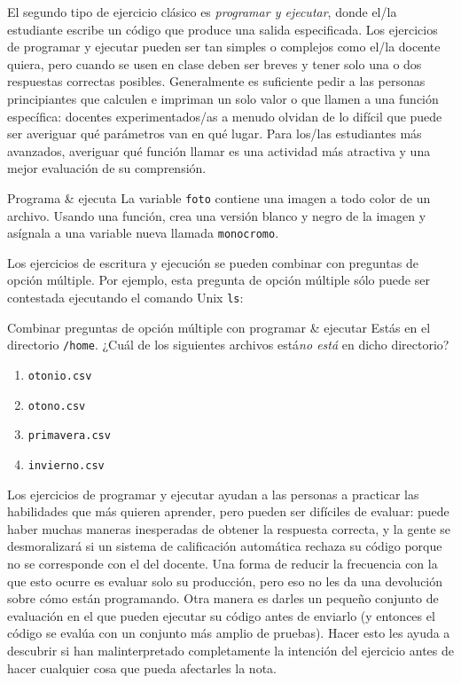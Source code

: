 El segundo tipo de ejercicio clásico es \emph{programar y ejecutar},
donde el/la estudiante escribe un código que produce una salida especificada. 
Los ejercicios de programar y ejecutar pueden ser tan simples o complejos como el/la docente quiera, pero cuando se usen en clase deben ser breves y tener solo una o dos respuestas correctas posibles.
Generalmente es suficiente pedir a las personas principiantes que calculen e impriman un solo valor o que llamen a una función específica:
docentes experimentados/as a menudo olvidan de lo difícil que puede ser averiguar qué parámetros van en qué lugar.
Para los/las estudiantes  más avanzados, averiguar qué función llamar es una actividad más atractiva y una mejor evaluación de su comprensión.

\begin{aside}{Programa \& ejecuta}
La variable \texttt{foto} contiene una imagen a todo color de un archivo.
Usando una función,
crea una versión blanco y negro de la imagen
y asígnala a una variable nueva llamada \texttt{monocromo}.
\end{aside}

Los ejercicios de escritura y ejecución se pueden combinar con preguntas de opción múltiple.
Por ejemplo,
esta pregunta de opción múltiple sólo puede ser contestada ejecutando el comando Unix \texttt{ls}:

\begin{aside}{Combinar preguntas de opción múltiple con programar \& ejecutar}
  Estás en el directorio  \texttt{/home}.
  ¿Cuál de los siguientes archivos está\emph{no está} en dicho directorio?
  \begin{enumerate}
  \item
    \texttt{otonio.csv}
  \item
    \texttt{otono.csv}
  \item
    \texttt{primavera.csv}
  \item
    \texttt{invierno.csv}
  \end{enumerate}
\end{aside}

Los ejercicios de programar y ejecutar ayudan a las personas a practicar las habilidades que más quieren aprender,
pero pueden ser  difíciles de evaluar:
puede haber muchas maneras inesperadas de obtener la respuesta correcta,
y la gente se desmoralizará si un sistema de calificación automática rechaza su código porque no se corresponde con el del docente.
Una forma de reducir la frecuencia con la que esto ocurre es evaluar solo su producción,
pero eso no les da una devolución sobre cómo están programando.
Otra manera es darles un pequeño conjunto de evaluación en el que pueden ejecutar su código antes de enviarlo
(y entonces el código se evalúa con un conjunto más amplio de pruebas).
Hacer esto les ayuda a descubrir si han malinterpretado completamente la intención del ejercicio antes de hacer cualquier cosa que pueda afectarles la nota.

